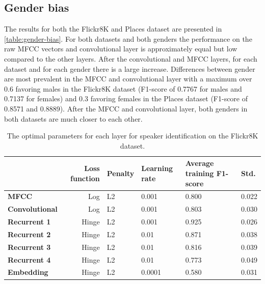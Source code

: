\documentclass[a4paper, oneside]{book}
\begin{document}
\subsection{Gender bias}\label{results:gender-bias}

The results for both the Flickr8K and Places dataset are presented in \autoref{table:gender-bias}. For both datasets and both genders the performance on the raw MFCC vectors and convolutional layer is approximately equal but low compared to the other layers. After the convolutional and MFCC layers, for each dataset and for each gender there is a large increase. Differences between gender are most prevalent in the MFCC and convolutional layer with a maximum over 0.6 favoring males in the Flickr8K dataset (F1-score of 0.7767 for males and 0.7137 for females) and 0.3 favoring females in the Places dataset (F1-score of 0.8571 and 0.8889). After the MFCC and convolutional layer, both genders in both datasets are much closer to each other.

\newpage
\begin{table}[H]
\begin{center}
\begin{tabular}{|l|r|l|l|l|l|}
\hline              & \bf Loss function     & \bf Penalty   & \bf Learning rate & \bf Average training F1-score & \bf Std. \\ \hline
\bf MFCC            & Log                   & L2            & 0.001             & 0.800                         & 0.022 \\
\bf Convolutional   & Log                   & L2            & 0.001             & 0.803                         & 0.030 \\ 
\bf Recurrent 1     & Hinge                 & L2            & 0.001             & 0.925                         & 0.026 \\
\bf Recurrent 2     & Hinge                 & L2            & 0.01              & 0.871                         & 0.038 \\
\bf Recurrent 3     & Hinge                 & L2            & 0.01              & 0.816                         & 0.039 \\
\bf Recurrent 4     & Hinge                 & L2            & 0.01              & 0.773                         & 0.049 \\
\bf Embedding       & Hinge                 & L2            & 0.0001            & 0.580                         & 0.031 \\
\hline
\end{tabular}
\end{center}
\caption{\label{table:speaker-identification-on-flickr8k-dataset} The optimal parameters for each layer for speaker identification on the Flickr8K dataset.  }
\end{table}
\end{document}
